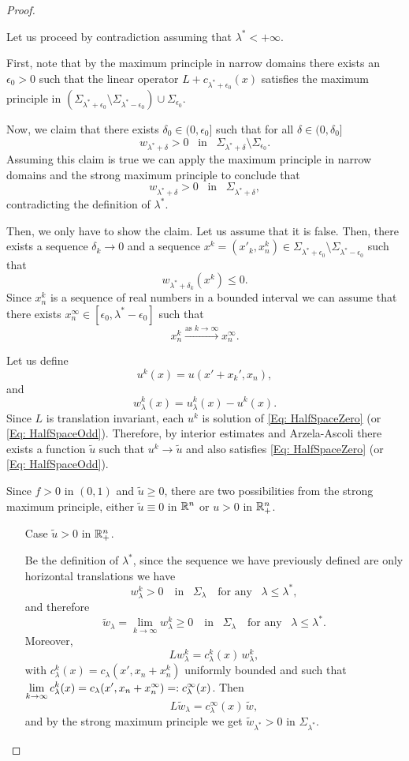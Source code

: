 \begin{proof}
\begin{itemize}
Let us proceed by contradiction assuming that $\lambda^*<+\infty$.

First, note that by the maximum principle in narrow domains there exists an $\epsilon_0>0$ such that the linear operator $L+c_{\lambda^*+\epsilon_0}(x)$ satisfies the maximum principle in $ \left( \Sigma_{\lambda^*+\epsilon_0} \setminus \Sigma_{\lambda^*-\epsilon_0}\right) \cup \Sigma_{\epsilon_0}. $

Now, we claim that there exists $\delta_0\in(0,\epsilon_0]$ such that for all $\delta\in(0,\delta_0]$
$$ w_{\lambda^*+\delta} > 0 \,\,\,\text{ in } \,\,\, \Sigma_{\lambda^*+\delta}\setminus \Sigma_{\epsilon_0}. $$
Assuming this claim is true we can apply the maximum principle in narrow domains and the strong maximum principle to conclude that
$$ w_{\lambda^*+\delta} > 0 \,\,\,\text{ in } \,\,\, \Sigma_{\lambda^*+\delta}, $$
contradicting the definition of $\lambda^*$.

Then, we only have to show the claim. Let us assume that it is false. Then, there exists a sequence $\delta_k \to 0$ and a sequence $x^k = (x'_k,x_n^k)\in \Sigma_{\lambda^*+\epsilon_0} \setminus \Sigma_{\lambda^*-\epsilon_0}$ such that
$$ w_{\lambda^* + \delta_k} (x^k) \leq 0. $$
Since $x_n^k$ is a sequence of real numbers in a bounded interval we can assume that there exists $x_n^\infty\in [\epsilon_0, \lambda^*-\epsilon_0]$ such that
$$ x_n^k \xrightarrow{\text{as } k \to \infty}{} x_n^\infty. $$

Let us define
$$ u^k(x) = u(x'+x_k',x_n), $$
and
$$ w_\lambda^k(x) = u_\lambda^k (x)- u^k(x). $$
Since $L$ is translation invariant, each $u^k$ is solution of \eqref{Eq: HalfSpaceZero} (or \eqref{Eq: HalfSpaceOdd}). Therefore, by interior estimates and Arzela-Ascoli \todo{!!!} there exists a function $\tilde{u}$ such that $u^k \to \tilde{u}$ and also satisfies \eqref{Eq: HalfSpaceZero} (or \eqref{Eq: HalfSpaceOdd}).

Since $f>0$ in $(0,1)$ and $\tilde{u}\geq 0$, there are two possibilities from the strong maximum principle, either $\tilde{u} \equiv 0$ in $\mathbb{R}^n$ or $u>0$ in $\mathbb{R}^n_+$.
\begin{itemize}
\item[Case ] $\tilde{u}>0$ in $\mathbb{R}^n_+$.

Be the definition of $\lambda^*$, since the sequence we have previously defined are only horizontal translations we have
$$ w_\lambda^k >0 \,\,\,\, \text{ in } \,\,\, \Sigma_\lambda \,\,\,\, \text{ for any } \,\,\, \lambda\leq \lambda^*, $$
and therefore
$$ \tilde{w}_\lambda = \lim_{k\to\infty} w_\lambda^k \geq 0\,\,\,\, \text{ in } \,\,\, \Sigma_\lambda \,\,\,\, \text{ for any } \,\,\, \lambda\leq \lambda^*. $$
Moreover,
$$ Lw_\lambda^k = c_\lambda^k(x)\,w_\lambda^k, $$
with $c_\lambda^k(x) = c_\lambda(x',x_n+x_n^k)$ uniformly bounded and such that $\displaystyle \lim_{k\to\infty} c_\lambda^k(x) = c_\lambda(x',x_n+x_n^\infty)=:c_\lambda^\infty(x)$. Then
$$ L\tilde{w}_\lambda = c_\lambda^\infty(x)\,\tilde{w}, $$
and by the strong maximum principle we get $\tilde{w}_{\lambda^*} >0$ in $\Sigma_{\lambda^*}$.


\end{itemize}
\end{itemize}
\end{proof}

